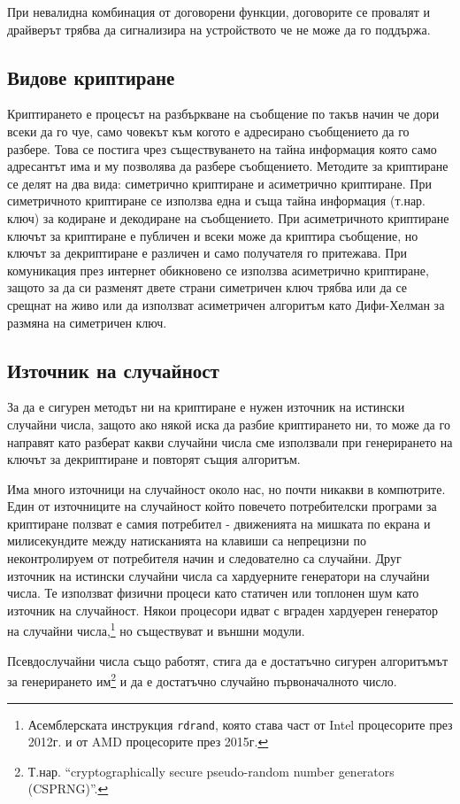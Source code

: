 При невалидна комбинация от договорени функции, договорите се провалят и драйверът трябва да сигнализира на устройството че не може да го поддържа.

\subsection{Видове криптиране}
Криптирането е процесът на разбъркване на съобщение по такъв начин че дори всеки да го чуе, само човекът към когото е адресирано съобщението да го разбере. Това се постига чрез съществуването на тайна информация която само адресантът има и му позволява да разбере съобщението. Методите за криптиране се делят на два вида: симетрично криптиране и асиметрично криптиране. При симетричното криптиране се използва една и съща тайна информация (т.нар. ключ) за кодиране и декодиране на съобщението. При асиметричното криптиране ключът за криптиране е публичен и всеки може да криптира съобщение, но ключът за декриптиране е различен и само получателя го притежава. При комуникация през интернет обикновено се използва асиметрично криптиране, защото за да си разменят двете страни симетричен ключ трябва или да се срещнат на живо или да използват асиметричен алгоритъм като Дифи-Хелман за размяна на симетричен ключ.

\subsection{Източник на случайност}
За да е сигурен методът ни на криптиране е нужен източник на истински случайни числа, защото ако някой иска да разбие криптирането ни, то може да го направят като разберат какви случайни числа сме използвали при генерирането на ключът за декриптиране и повторят същия алгоритъм.

Има много източници на случайност около нас, но почти никакви в компютрите. Един от източниците на случайност който повечето потребителски програми за криптиране ползват е самия потребител - движенията на мишката по екрана и милисекундите между натисканията на клавиши са непрецизни по неконтролируем от потребителя начин и следователно са случайни. Друг източник на истински случайни числа са хардуерните генератори на случайни числа. Те използват физични процеси като статичен или топлонен шум като източник на случайност. Някои процесори идват с вграден хардуерен генератор на случайни числа,\footnote{Асемблерската инструкция {\tt rdrand}, която става част от Intel процесорите през 2012г. и от AMD процесорите през 2015г.} но съществуват и външни модули.

Псевдослучайни числа също работят, стига да е достатъчно сигурен алгоритъмът за генерирането им\footnote{Т.нар. ``cryptographically secure pseudo-random number generators (CSPRNG)''.} и да е достатъчно случайно първоначалното число.
